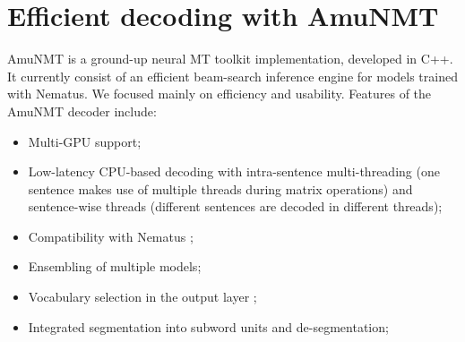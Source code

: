 \documentclass[11pt]{article}
\begin{document}

\section{Efficient decoding with AmuNMT}
AmuNMT is a ground-up neural MT toolkit implementation, developed in C++. It currently consist of an efficient beam-search inference engine for models trained with Nematus. We focused mainly on efficiency and usability. Features of the AmuNMT decoder include:

\begin{itemize}
 \item Multi-GPU support;
  \item Low-latency CPU-based decoding with intra-sentence multi-threading (one sentence makes use of multiple threads during matrix operations) and sentence-wise threads (different sentences are decoded in different threads);
 \item Compatibility with Nematus \cite{DBLP:conf/wmt/SennrichHB16};
 \item Ensembling of multiple models;
 \item Vocabulary selection in the output layer \cite{DBLP:conf/acl/JeanCMB15,DBLP:conf/acl/MiWI16};
 \item Integrated segmentation into subword units \cite{DBLP:journals/corr/SennrichHB15} and de-segmentation;
\end{itemize}
\end{document}
